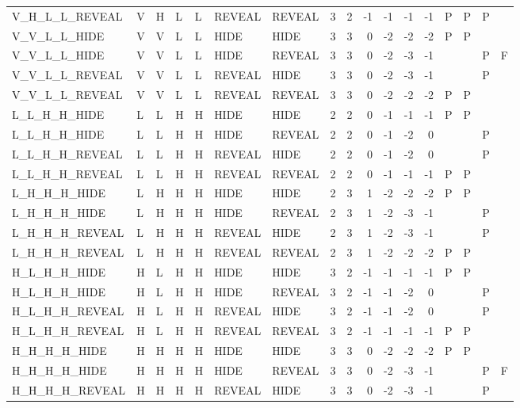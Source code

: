 \begin{longtable}{lllllllrrrrrrllll}
  V\_H\_L\_L\_REVEAL & V & H & L & L & REVEAL & REVEAL & 3 & 2 & -1 & -1 & -1 & -1 & P & P & P &  \\ 
  V\_V\_L\_L\_HIDE & V & V & L & L & HIDE & HIDE & 3 & 3 & 0 & -2 & -2 & -2 & P & P &  &  \\ 
  V\_V\_L\_L\_HIDE & V & V & L & L & HIDE & REVEAL & 3 & 3 & 0 & -2 & -3 & -1 &  &  & P & F \\ 
  V\_V\_L\_L\_REVEAL & V & V & L & L & REVEAL & HIDE & 3 & 3 & 0 & -2 & -3 & -1 &  &  & P &  \\ 
  V\_V\_L\_L\_REVEAL & V & V & L & L & REVEAL & REVEAL & 3 & 3 & 0 & -2 & -2 & -2 & P & P &  &  \\ 
  L\_L\_H\_H\_HIDE & L & L & H & H & HIDE & HIDE & 2 & 2 & 0 & -1 & -1 & -1 & P & P &  &  \\ 
  L\_L\_H\_H\_HIDE & L & L & H & H & HIDE & REVEAL & 2 & 2 & 0 & -1 & -2 & 0 &  &  & P &  \\ 
  L\_L\_H\_H\_REVEAL & L & L & H & H & REVEAL & HIDE & 2 & 2 & 0 & -1 & -2 & 0 &  &  & P &  \\ 
  L\_L\_H\_H\_REVEAL & L & L & H & H & REVEAL & REVEAL & 2 & 2 & 0 & -1 & -1 & -1 & P & P &  &  \\ 
  L\_H\_H\_H\_HIDE & L & H & H & H & HIDE & HIDE & 2 & 3 & 1 & -2 & -2 & -2 & P & P &  &  \\ 
  L\_H\_H\_H\_HIDE & L & H & H & H & HIDE & REVEAL & 2 & 3 & 1 & -2 & -3 & -1 &  &  & P &  \\ 
  L\_H\_H\_H\_REVEAL & L & H & H & H & REVEAL & HIDE & 2 & 3 & 1 & -2 & -3 & -1 &  &  & P &  \\ 
  L\_H\_H\_H\_REVEAL & L & H & H & H & REVEAL & REVEAL & 2 & 3 & 1 & -2 & -2 & -2 & P & P &  &  \\ 
  H\_L\_H\_H\_HIDE & H & L & H & H & HIDE & HIDE & 3 & 2 & -1 & -1 & -1 & -1 & P & P &  &  \\ 
  H\_L\_H\_H\_HIDE & H & L & H & H & HIDE & REVEAL & 3 & 2 & -1 & -1 & -2 & 0 &  &  & P &  \\ 
  H\_L\_H\_H\_REVEAL & H & L & H & H & REVEAL & HIDE & 3 & 2 & -1 & -1 & -2 & 0 &  &  & P &  \\ 
  H\_L\_H\_H\_REVEAL & H & L & H & H & REVEAL & REVEAL & 3 & 2 & -1 & -1 & -1 & -1 & P & P &  &  \\ 
  H\_H\_H\_H\_HIDE & H & H & H & H & HIDE & HIDE & 3 & 3 & 0 & -2 & -2 & -2 & P & P &  &  \\ 
  H\_H\_H\_H\_HIDE & H & H & H & H & HIDE & REVEAL & 3 & 3 & 0 & -2 & -3 & -1 &  &  & P & F \\ 
  H\_H\_H\_H\_REVEAL & H & H & H & H & REVEAL & HIDE & 3 & 3 & 0 & -2 & -3 & -1 &  &  & P &  \\ 

\end{longtable}
